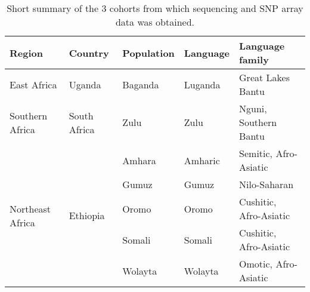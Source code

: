 \begin{table}[ht]
\centering
\begin{tabular}{l|l|l|l|l}
Region & Country & Population & Language & Language family \\ \hline
East Africa & Uganda\cite{Asiki01022013} & Baganda & Luganda & Great Lakes Bantu \\ \hline
Southern Africa & South Africa & Zulu & Zulu & Nguni, Southern Bantu \\ \hline
\multirow{5}{*}{Northeast Africa} & \multirow{5}{*}{Ethiopia} & Amhara & Amharic & Semitic, Afro-Asiatic \\
& & Gumuz & Gumuz & Nilo-Saharan \\
& & Oromo & Oromo & Cushitic, Afro-Asiatic \\
& & Somali & Somali & Cushitic, Afro-Asiatic \\
& & Wolayta & Wolayta & Omotic, Afro-Asiatic \\
\hline
\end{tabular}
\caption{Short summary of the 3 cohorts from which sequencing and SNP array data was obtained.}
\label{tab:short_summary}
\end{table}